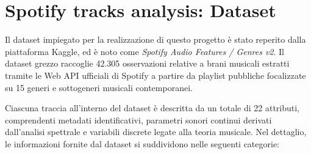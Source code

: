 \documentclass[12pt,a4paper]{article}
\begin{document}
\newpage
\section{Spotify tracks analysis: Dataset}

Il dataset impiegato per la realizzazione di questo progetto è stato reperito dalla piattaforma Kaggle, ed è noto come \textit{Spotify Audio Features / Genres v2}. Il dataset grezzo raccoglie 42.305 osservazioni relative a brani musicali estratti tramite le Web API ufficiali di Spotify a partire da playlist pubbliche focalizzate su 15 generi e sottogeneri musicali contemporanei. 

Ciascuna traccia all'interno del dataset è descritta da un totale di 22 attributi, comprendenti metadati identificativi, parametri sonori continui derivati dall'analisi spettrale e variabili discrete legate alla teoria musicale. Nel dettaglio, le informazioni fornite dal dataset si suddividono nelle seguenti categorie:
\end{document}
